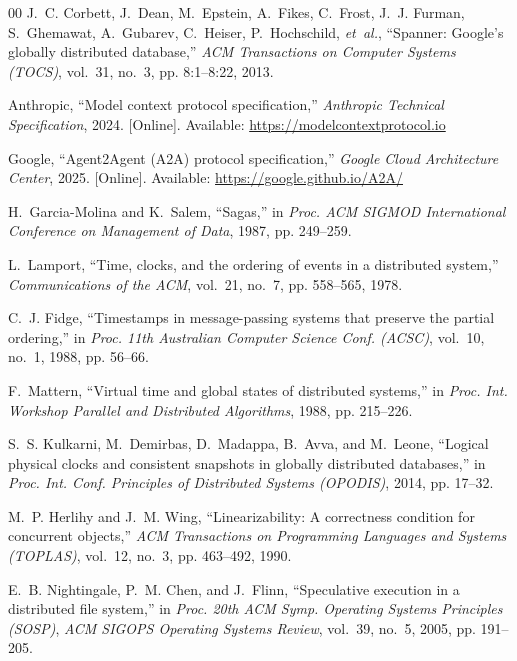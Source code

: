 \documentclass[conference,10pt]{IEEEtran}
\begin{document}
\begin{thebibliography}{00}
J.~C. Corbett, J.~Dean, M.~Epstein, A.~Fikes, C.~Frost, J.~J. Furman, S.~Ghemawat, A.~Gubarev, C.~Heiser, P.~Hochschild, \emph{et~al.}, ``Spanner: Google's globally distributed database,'' \emph{ACM Transactions on Computer Systems (TOCS)}, vol.~31, no.~3, pp. 8:1--8:22, 2013.

Anthropic, ``Model context protocol specification,'' \emph{Anthropic Technical Specification}, 2024. [Online]. Available: \url{https://modelcontextprotocol.io}

Google, ``Agent2Agent (A2A) protocol specification,'' \emph{Google Cloud Architecture Center}, 2025. [Online]. Available: \url{https://google.github.io/A2A/}

H.~Garcia-Molina and K.~Salem, ``Sagas,'' in \emph{Proc. ACM SIGMOD International Conference on Management of Data}, 1987, pp. 249--259.

L.~Lamport, ``Time, clocks, and the ordering of events in a distributed system,'' \emph{Communications of the ACM}, vol.~21, no.~7, pp. 558--565, 1978.

C.~J. Fidge, ``Timestamps in message-passing systems that preserve the partial ordering,'' in \emph{Proc. 11th Australian Computer Science Conf. (ACSC)}, vol.~10, no.~1, 1988, pp. 56--66.

F.~Mattern, ``Virtual time and global states of distributed systems,'' in \emph{Proc. Int. Workshop Parallel and Distributed Algorithms}, 1988, pp. 215--226.

S.~S. Kulkarni, M.~Demirbas, D.~Madappa, B.~Avva, and M.~Leone, ``Logical physical clocks and consistent snapshots in globally distributed databases,'' in \emph{Proc. Int. Conf. Principles of Distributed Systems (OPODIS)}, 2014, pp. 17--32.

M.~P. Herlihy and J.~M. Wing, ``Linearizability: A correctness condition for concurrent objects,'' \emph{ACM Transactions on Programming Languages and Systems (TOPLAS)}, vol.~12, no.~3, pp. 463--492, 1990.

E.~B. Nightingale, P.~M. Chen, and J.~Flinn, ``Speculative execution in a distributed file system,'' in \emph{Proc. 20th ACM Symp. Operating Systems Principles (SOSP)}, \emph{ACM SIGOPS Operating Systems Review}, vol.~39, no.~5, 2005, pp. 191--205.


\end{thebibliography}
\end{document}
